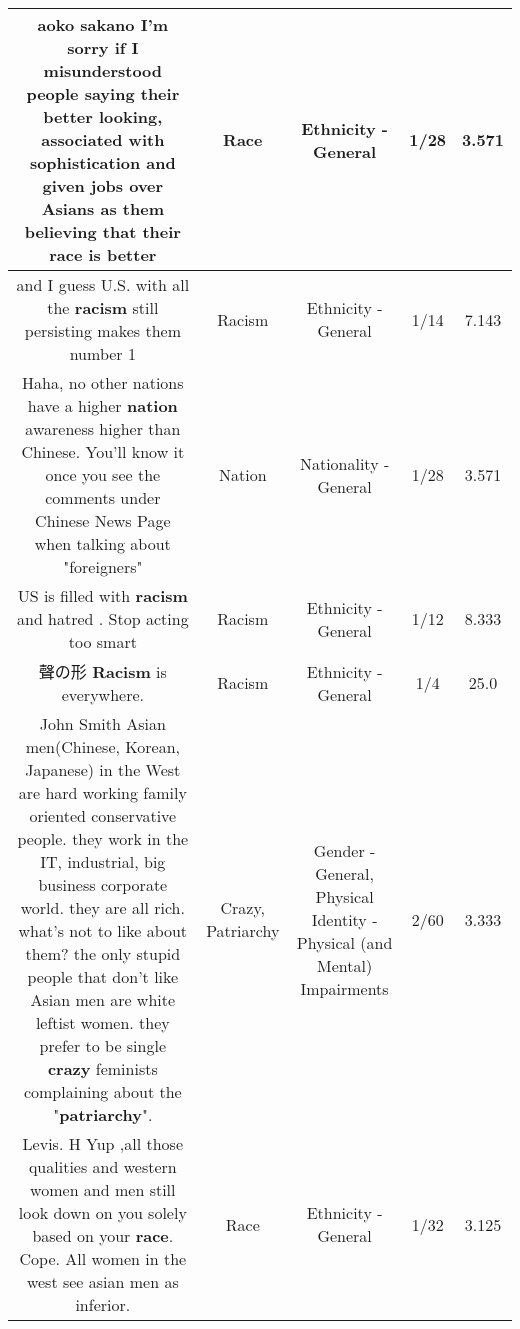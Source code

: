\documentclass[11pt]{article}
\newlength\mylength
\begin{document}
\begin{center}
\begin{longtable}{|C{.65\mylength}|C{.30\mylength}|C{.12\mylength}|C{.12\mylength}|C{.12\mylength}|}
  \small aoko sakano I'm sorry if I misunderstood  people saying their better looking, associated with sophistication and given jobs over Asians  as them believing that their \textbf{race} is better\normalsize   & Race & Ethnicity - General & 1/28 & 3.571 \\  \hline
  \small and I guess U.S. with all the \textbf{racism} still persisting makes them number 1\normalsize   & Racism & Ethnicity - General & 1/14 & 7.143 \\  \hline
  \small Haha, no other nations have a higher \textbf{nation} awareness higher than Chinese. You'll know it once you see the comments under Chinese News Page when talking about "foreigners"\normalsize   & Nation & Nationality - General & 1/28 & 3.571 \\  \hline
  \small US is filled with \textbf{racism} and hatred . Stop acting too smart\normalsize   & Racism & Ethnicity - General & 1/12 & 8.333 \\  \hline
  \small 聲の形 \textbf{Racism} is everywhere.\normalsize   & Racism & Ethnicity - General & 1/4 & 25.0 \\  \hline
  \small John Smith Asian men(Chinese, Korean, Japanese) in the West are hard working family oriented conservative people. they work in the IT, industrial, big business corporate world. they are all rich. what's not to like about them? the only stupid people that don't like Asian men are white leftist women. they prefer to be single \textbf{crazy} feminists complaining about the "\textbf{patriarchy}".\normalsize   & Crazy, Patriarchy & Gender - General, Physical Identity - Physical (and Mental) Impairments & 2/60 & 3.333 \\  \hline
  \small Levis. H Yup ,all those qualities and western women and men still look down on you solely based on your \textbf{race}. Cope. All women in the west see asian men as inferior.\normalsize   & Race & Ethnicity - General & 1/32 & 3.125 \\  \hline

\end{longtable}
\end{center}
\end{document}
